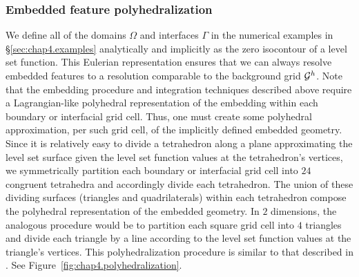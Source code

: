 \subsubsection{Embedded feature polyhedralization} \label{subsubsec:chap4.polyhedralization}

We define all of the domains $\Omega$ and interfaces $\Gamma$ in the numerical examples in \S\ref{sec:chap4.examples} analytically and implicitly as the zero isocontour of a level set function. This Eulerian representation ensures that we can always resolve embedded features to a resolution comparable to the background grid $\mathcal{G}^h$. Note that the embedding procedure and integration techniques described above require a Lagrangian-like polyhedral representation of the embedding within each boundary or interfacial grid cell. Thus, one must create some polyhedral approximation, per such grid cell, of the implicitly defined embedded geometry. Since it is relatively easy to divide a tetrahedron along a plane approximating the level set surface given the level set function values at the tetrahedron's vertices, we symmetrically partition each boundary or interfacial grid cell into $24$ congruent tetrahedra and accordingly divide each tetrahedron. The union of these dividing surfaces (triangles and quadrilaterals) within each tetrahedron compose the polyhedral representation of the embedded geometry. In $2$ dimensions, the analogous procedure would be to partition each square grid cell into $4$ triangles and divide each triangle by a line according to the level set function values at the triangle's vertices. This polyhedralization procedure is similar to that described in \cite{Min.Chohong07}. See Figure~\ref{fig:chap4.polyhedralization}.

